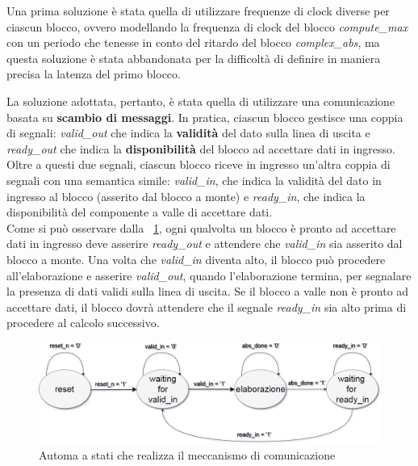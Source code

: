 \documentclass[12pt,a4paper,twoside,openany]{book}
\begin{document}
Una prima soluzione è stata quella di utilizzare frequenze di clock diverse per ciascun blocco, ovvero modellando la frequenza di clock del blocco \textit{compute\_max} con un periodo che tenesse in conto del ritardo del blocco \textit{complex\_abs}, ma questa soluzione è stata abbandonata per la difficoltà di definire in maniera precisa la latenza del primo blocco.

La soluzione adottata, pertanto, è stata quella di utilizzare una comunicazione basata su \textbf{scambio di messaggi}. In pratica, ciascun blocco gestisce una coppia di segnali: \textit{valid\_out} che indica la \textbf{validità} del dato sulla linea di uscita e \textit{ready\_out} che indica la \textbf{disponibilità} del blocco ad accettare dati in ingresso. Oltre a questi due segnali, ciascun blocco riceve in ingresso un'altra coppia di segnali con una semantica simile: \textit{valid\_in}, che indica la validità del dato in ingresso al blocco (asserito dal blocco a monte) e \textit{ready\_in}, che indica la disponibilità del componente a valle di accettare dati. \\
Come si può osservare dalla \figurename~\ref{wrapperabs_fsm}, ogni qualvolta un blocco è pronto ad accettare dati in ingresso deve asserire \textit{ready\_out} e attendere che \textit{valid\_in} sia asserito dal blocco a monte. Una volta che \textit{valid\_in} diventa alto, il blocco può procedere all'elaborazione e asserire \textit{valid\_out}, quando l'elaborazione termina, per segnalare la presenza di dati validi sulla linea di uscita. Se il blocco a valle non è pronto ad accettare dati, il blocco dovrà attendere che il segnale \textit{ready\_in} sia alto prima di procedere al calcolo successivo.

\begin{figure}
\begin{center}
\includegraphics[scale=0.35, keepaspectratio]{immagini/fsm_wrapper_abs}
\caption{Automa a stati che realizza il meccanismo di comunicazione}
\label{wrapperabs_fsm}
\end{center}
\end{figure}
\end{document}
